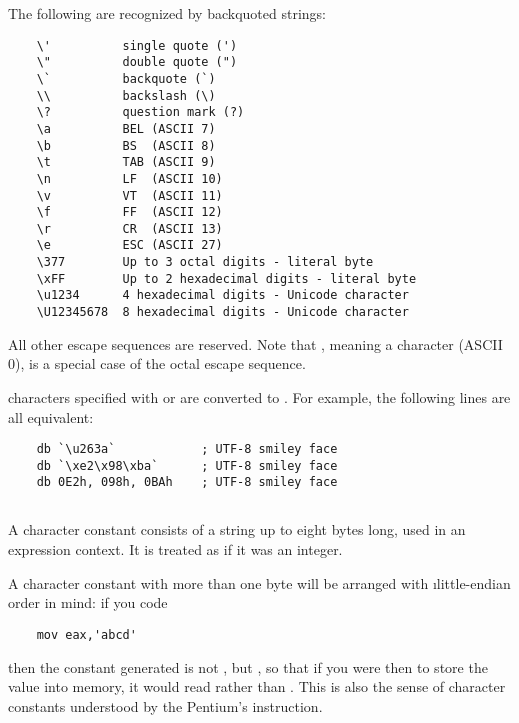 The following  are recognized by backquoted strings:

\begin{lstlisting}
	\'          single quote (')
	\"          double quote (")
	\`          backquote (`)
	\\          backslash (\)
	\?          question mark (?)
	\a          BEL (ASCII 7)
	\b          BS  (ASCII 8)
	\t          TAB (ASCII 9)
	\n          LF  (ASCII 10)
	\v          VT  (ASCII 11)
	\f          FF  (ASCII 12)
	\r          CR  (ASCII 13)
	\e          ESC (ASCII 27)
	\377        Up to 3 octal digits - literal byte
	\xFF        Up to 2 hexadecimal digits - literal byte
	\u1234      4 hexadecimal digits - Unicode character
	\U12345678  8 hexadecimal digits - Unicode character
\end{lstlisting}

All other escape sequences are reserved. Note that ,
meaning a  character (ASCII 0), is a special case of
the octal escape sequence.

 characters specified with \code{\\u} or \code{\\U}
are converted to . For example, the following lines
are all equivalent:

\begin{lstlisting}
	db `\u263a`            ; UTF-8 smiley face
	db `\xe2\x98\xba`      ; UTF-8 smiley face
	db 0E2h, 098h, 0BAh    ; UTF-8 smiley face
\end{lstlisting}

\subsection{}
\label{subsec:chrconst}

A character constant consists of a string up to eight bytes long, used
in an expression context. It is treated as if it was an integer.

A character constant with more than one byte will be arranged
with \i{little-endian} order in mind: if you code

\begin{lstlisting}
	mov eax,'abcd'
\end{lstlisting}

then the constant generated is not , but ,
so that if you were then to store the value into memory, it would read
 rather than . This is also the sense of character
constants understood by the Pentium's  instruction.

